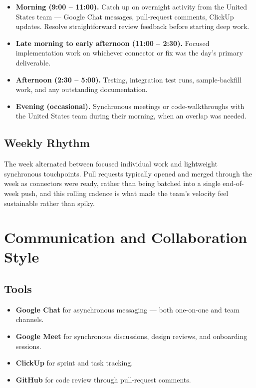 \begin{itemize}[leftmargin=*]
    \item \textbf{Morning (9:00 -- 11:00).} Catch up on overnight
    activity from the United States team --- Google Chat messages,
    pull-request comments, ClickUp updates. Resolve straightforward
    review feedback before starting deep work.
    \item \textbf{Late morning to early afternoon (11:00 -- 2:30).}
    Focused implementation work on whichever connector or fix was the
    day's primary deliverable.
    \item \textbf{Afternoon (2:30 -- 5:00).} Testing, integration test
    runs, sample-backfill work, and any outstanding documentation.
    \item \textbf{Evening (occasional).} Synchronous meetings or
    code-walkthroughs with the United States team during their
    morning, when an overlap was needed.
\end{itemize}

\subsection{Weekly Rhythm}
The week alternated between focused individual work and lightweight
synchronous touchpoints. Pull requests typically opened and merged
through the week as connectors were ready, rather than being
batched into a single end-of-week push, and this rolling cadence is
what made the team's velocity feel sustainable rather than spiky.

\section{Communication and Collaboration Style}
\subsection{Tools}
\begin{itemize}[leftmargin=*]
    \item \textbf{Google Chat} for asynchronous messaging --- both
    one-on-one and team channels.
    \item \textbf{Google Meet} for synchronous discussions, design
    reviews, and onboarding sessions.
    \item \textbf{ClickUp} for sprint and task tracking.
    \item \textbf{GitHub} for code review through pull-request
    comments.
\end{itemize}

